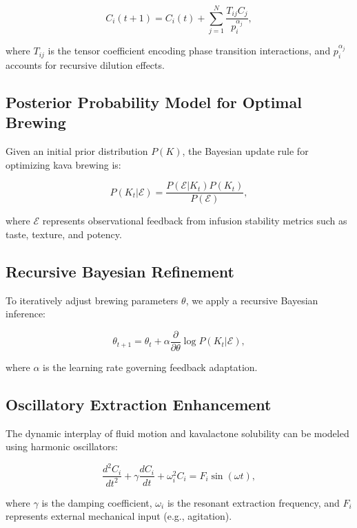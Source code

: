 \documentclass{article}
\theoremstyle{plain}
\theoremstyle{claimstyle}
\begin{document}
\begin{equation}
    C_i(t+1) = C_i(t) + \sum_{j=1}^{N} \frac{T_{ij} C_j}{p_i^{\alpha_j}},
\end{equation}

where \( T_{ij} \) is the tensor coefficient encoding phase transition interactions, and \( p_i^{\alpha_j} \) accounts for recursive dilution effects.


\subsection{Posterior Probability Model for Optimal Brewing}
Given an initial prior distribution \( P(K) \), the Bayesian update rule for optimizing kava brewing is:

\begin{equation}
    P(K_t | \mathcal{E}) = \frac{P(\mathcal{E} | K_t) P(K_t)}{P(\mathcal{E})},
\end{equation}

where \( \mathcal{E} \) represents observational feedback from infusion stability metrics such as taste, texture, and potency.

\subsection{Recursive Bayesian Refinement}
To iteratively adjust brewing parameters \( \theta \), we apply a recursive Bayesian inference:

\begin{equation}
    \theta_{t+1} = \theta_t + \alpha \frac{\partial}{\partial \theta} \log P(K_t | \mathcal{E}),
\end{equation}

where \( \alpha \) is the learning rate governing feedback adaptation.


\subsection{Oscillatory Extraction Enhancement}
The dynamic interplay of fluid motion and kavalactone solubility can be modeled using harmonic oscillators:

\begin{equation}
    \frac{d^2 C_i}{dt^2} + \gamma \frac{dC_i}{dt} + \omega_i^2 C_i = F_i \sin(\omega t),
\end{equation}

where \( \gamma \) is the damping coefficient, \( \omega_i \) is the resonant extraction frequency, and \( F_i \) represents external mechanical input (e.g., agitation).
\end{document}
